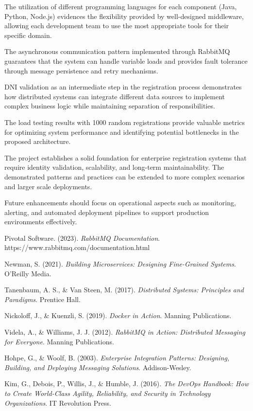 \documentclass[10pt,a4paper]{article}
\theoremstyle{definition}
\theoremstyle{remark}
\begin{document}
The utilization of different programming languages for each component (Java, Python, Node.js) evidences the flexibility provided by well-designed middleware, allowing each development team to use the most appropriate tools for their specific domain.

The asynchronous communication pattern implemented through RabbitMQ guarantees that the system can handle variable loads and provides fault tolerance through message persistence and retry mechanisms.

DNI validation as an intermediate step in the registration process demonstrates how distributed systems can integrate different data sources to implement complex business logic while maintaining separation of responsibilities.

The load testing results with 1000 random registrations provide valuable metrics for optimizing system performance and identifying potential bottlenecks in the proposed architecture.

The project establishes a solid foundation for enterprise registration systems that require identity validation, scalability, and long-term maintainability. The demonstrated patterns and practices can be extended to more complex scenarios and larger scale deployments.

Future enhancements should focus on operational aspects such as monitoring, alerting, and automated deployment pipelines to support production environments effectively.

\nocite{*}
\begin{thebibliography}{99}
 Pivotal Software. (2023). \textit{RabbitMQ Documentation}. https://www.rabbitmq.com/documentation.html

 Newman, S. (2021). \textit{Building Microservices: Designing Fine-Grained Systems}. O'Reilly Media.

 Tanenbaum, A. S., \& Van Steen, M. (2017). \textit{Distributed Systems: Principles and Paradigms}. Prentice Hall.

 Nickoloff, J., \& Kuenzli, S. (2019). \textit{Docker in Action}. Manning Publications.

 Videla, A., \& Williams, J. J. (2012). \textit{RabbitMQ in Action: Distributed Messaging for Everyone}. Manning Publications.

 Hohpe, G., \& Woolf, B. (2003). \textit{Enterprise Integration Patterns: Designing, Building, and Deploying Messaging Solutions}. Addison-Wesley.

 Kim, G., Debois, P., Willis, J., \& Humble, J. (2016). \textit{The DevOps Handbook: How to Create World-Class Agility, Reliability, and Security in Technology Organizations}. IT Revolution Press.
\end{thebibliography}
\end{document}
